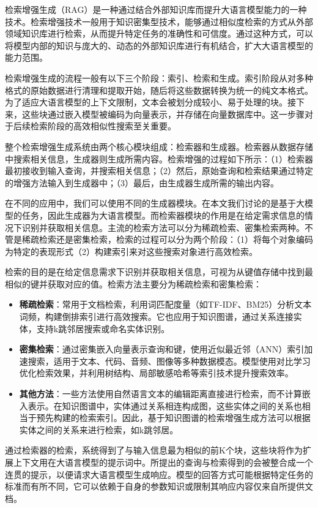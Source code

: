 检索增强生成（RAG）是一种通过结合外部知识库而提升大语言模型能力的一种技术\cite{fan2024survey, IGXN202410016}。检索增强技术一般用于知识密集型技术，能够通过相似度检索的方式从外部领域知识库进行检索，从而提升特定任务的准确性和可信度。通过这种方式，可以将模型内部的知识与庞大的、动态的外部知识库进行有机结合，扩大大语言模型的能力范围。

检索增强生成的流程一般有以下三个阶段：索引、检索和生成。索引阶段从对多种格式的原始数据进行清理和提取开始，随后将这些数据转换为统一的纯文本格式。为了适应大语言模型的上下文限制，文本会被划分成较小、易于处理的块。接下来，这些块通过嵌入模型被编码为向量表示，并存储在向量数据库中。这一步骤对于后续检索阶段的高效相似性搜索至关重要。

整个检索增强生成系统由两个核心模块组成：检索器和生成器。检索器从数据存储中搜索相关信息，生成器则生成所需内容。检索增强的过程如下所示：（1）检索器最初接收到输入查询，并搜索相关信息；（2）然后，原始查询和检索结果通过特定的增强方法输入到生成器中；（3）最后，由生成器生成所需的输出内容。

在不同的应用中，我们可以使用不同的生成器模块。在本文我们讨论的是基于大模型的任务，因此生成器为大语言模型。而检索器模块的作用是在给定需求信息的情况下识别并获取相关信息。主流的检索方法可以分为稀疏检索、密集检索两种。不管是稀疏检索还是密集检索，检索的过程可以分为两个阶段：（1）将每个对象编码为特定的表现形式（2）构建索引来对这些搜索对象进行高效检索。

检索的目的是在给定信息需求下识别并获取相关信息，可视为从键值存储中找到最相似的键并获取对应的值。检索方法主要分为稀疏检索和密集检索：

\begin{itemize}
    \item \textbf{稀疏检索}：常用于文档检索，利用词匹配度量（如TF-IDF、BM25）分析文本词频，构建倒排索引进行高效搜索。它也应用于知识图谱，通过关系连接实体，支持k跳邻居搜索或命名实体识别。
    \item \textbf{密集检索}：通过密集嵌入向量表示查询和键，使用近似最近邻（ANN）索引加速搜索，适用于文本、代码、音频、图像等多种数据模态。模型使用对比学习优化检索效果，并利用树结构、局部敏感哈希等索引技术提升搜索效率。
    \item \textbf{其他方法}：一些方法使用自然语言文本的编辑距离直接进行检索，而不计算嵌入表示。在知识图谱中，实体通过关系相连构成图，这些实体之间的关系也相当于预先构建的检索索引。因此，基于知识图谱的检索增强生成方法可以根据实体之间的关系来进行检索，如k跳邻居\cite{Ye2021, Shu2022}。
\end{itemize}

通过检索器的检索，系统得到了与输入信息最为相似的前K个块，这些块将作为扩展上下文用在大语言模型的提示词中。所提出的查询与检索得到的会被整合成一个连贯的提示，以便请求大语言模型生成响应。模型的回答方式可能根据特定任务的标准而有所不同，它可以依赖于自身的参数知识或限制其响应内容仅来自所提供文档。

